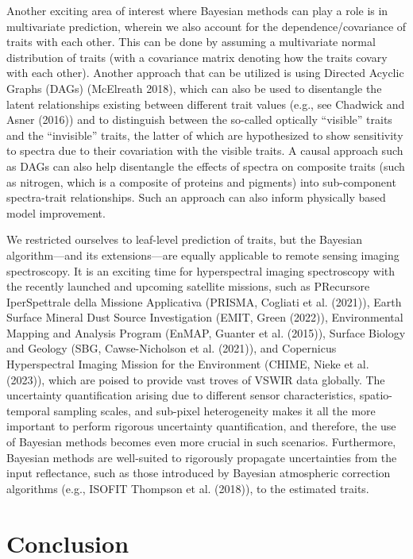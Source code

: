 \documentclass[
  letterpaper,
  DIV=11,
  numbers=noendperiod]{scrartcl}
\begin{document}
Another exciting area of interest where Bayesian methods can play a role
is in multivariate prediction, wherein we also account for the
dependence/covariance of traits with each other. This can be done by
assuming a multivariate normal distribution of traits (with a covariance
matrix denoting how the traits covary with each other). Another approach
that can be utilized is using Directed Acyclic Graphs (DAGs) (McElreath
2018), which can also be used to disentangle the latent relationships
existing between different trait values (e.g., see Chadwick and Asner
(2016)) and to distinguish between the so-called optically ``visible''
traits and the ``invisible'' traits, the latter of which are
hypothesized to show sensitivity to spectra due to their covariation
with the visible traits. A causal approach such as DAGs can also help
disentangle the effects of spectra on composite traits (such as
nitrogen, which is a composite of proteins and pigments) into
sub-component spectra-trait relationships. Such an approach can also
inform physically based model improvement.

We restricted ourselves to leaf-level prediction of traits, but the
Bayesian algorithm---and its extensions---are equally applicable to
remote sensing imaging spectroscopy. It is an exciting time for
hyperspectral imaging spectroscopy with the recently launched and
upcoming satellite missions, such as PRecursore IperSpettrale della
Missione Applicativa (PRISMA, Cogliati et al. (2021)), Earth Surface
Mineral Dust Source Investigation (EMIT, Green (2022)), Environmental
Mapping and Analysis Program (EnMAP, Guanter et al. (2015)), Surface
Biology and Geology (SBG, Cawse-Nicholson et al. (2021)), and Copernicus
Hyperspectral Imaging Mission for the Environment (CHIME, Nieke et al.
(2023)), which are poised to provide vast troves of VSWIR data globally.
The uncertainty quantification arising due to different sensor
characteristics, spatio-temporal sampling scales, and sub-pixel
heterogeneity makes it all the more important to perform rigorous
uncertainty quantification, and therefore, the use of Bayesian methods
becomes even more crucial in such scenarios. Furthermore, Bayesian
methods are well-suited to rigorously propagate uncertainties from the
input reflectance, such as those introduced by Bayesian atmospheric
correction algorithms (e.g., ISOFIT Thompson et al. (2018)), to the
estimated traits.

\hypertarget{conclusion}{%
\section{Conclusion}\label{conclusion}}
\end{document}
